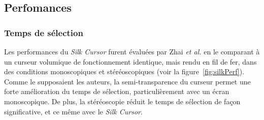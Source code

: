 	\subsection{Perfomances}
	\subsubsection{Temps de sélection}
	Les performances du \emph{Silk Cursor} furent évaluées par Zhai \emph{et al.} en le comparant à un curseur volumique de fonctionnement identique, mais rendu en fil de fer, dans des conditions monoscopiques et stéréoscopiques (voir la figure~\ref{fig:silkPerf}). Comme le supposaient les auteurs, la semi-transparence du curseur permet une forte amélioration du temps de sélection, particulièrement avec un écran monoscopique. De plus, la stéréoscopie réduit le temps de sélection de façon significative, et ce même avec le \emph{Silk Cursor}.
	
